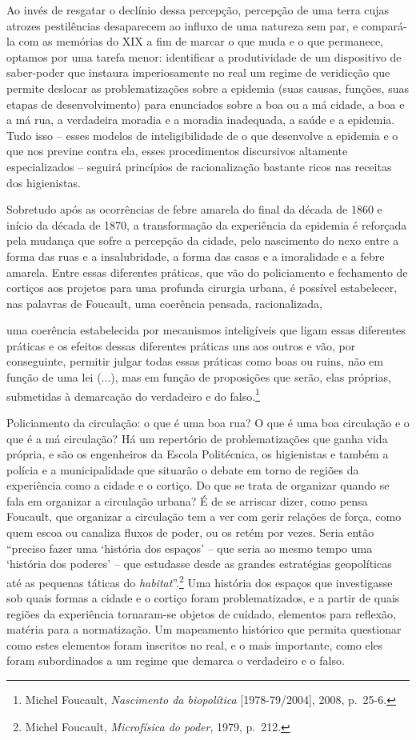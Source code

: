 Ao invés de resgatar o declínio dessa percepção, percepção de uma terra
cujas atrozes pestilências desaparecem ao influxo de uma natureza sem
par, e compará-la com as memórias do XIX a fim de marcar o que muda e o
que permanece, optamos por uma tarefa menor: identificar a produtividade
de um dispositivo de saber-poder que instaura imperiosamente no real um
regime de veridicção que permite deslocar as problematizações sobre a
epidemia (suas causas, funções, suas etapas de desenvolvimento) para
enunciados sobre a boa ou a má cidade, a boa e a má rua, a verdadeira
moradia e a moradia inadequada, a saúde e a epidemia. Tudo isso -- esses
modelos de inteligibilidade de o que desenvolve a epidemia e o que nos
previne contra ela, esses procedimentos discursivos altamente
especializados -- seguirá princípios de racionalização bastante ricos
nas receitas dos higienistas.

Sobretudo após as ocorrências de febre amarela do final da década de
1860 e início da década de 1870, a transformação da experiência da
epidemia é reforçada pela mudança que sofre a percepção da cidade, pelo
nascimento do nexo entre a forma das ruas e a insalubridade, a forma das
casas e a imoralidade e a febre amarela. Entre essas diferentes
práticas, que vão do policiamento e fechamento de cortiços aos projetos
para uma profunda cirurgia urbana, é possível estabelecer, nas palavras
de Foucault, uma coerência pensada, racionalizada,

uma coerência estabelecida por mecanismos inteligíveis que ligam essas
diferentes práticas e os efeitos dessas diferentes práticas uns aos
outros e vão, por conseguinte, permitir julgar todas essas práticas como
boas ou ruins, não em função de uma lei (...), mas em função de
proposições que serão, elas próprias, submetidas à demarcação do
verdadeiro e do falso.\footnote{Michel Foucault, \emph{Nascimento da
  biopolítica} {[}1978-79/2004{]}, 2008, p.~25-6.}

Policiamento da circulação: o que é uma boa rua? O que é uma boa
circulação e o que é a má circulação? Há um repertório de
problematizações que ganha vida própria, e são os engenheiros da Escola
Politécnica, os higienistas e também a polícia e a municipalidade que
situarão o debate em torno de regiões da experiência como a cidade e o
cortiço. Do que se trata de organizar quando se fala em organizar a
circulação urbana? É de se arriscar dizer, como pensa Foucault, que
organizar a circulação tem a ver com gerir relações de força, como quem
escoa ou canaliza fluxos de poder, ou os retém por vezes. Seria então
``preciso fazer uma `história dos espaços' -- que seria ao mesmo tempo
uma `história dos poderes' -- que estudasse desde as grandes estratégias
geopolíticas até as pequenas táticas do \emph{habitat}''.\footnote{Michel
  Foucault, \emph{Microfísica do poder}, 1979, p.~212.} Uma história dos
espaços que investigasse sob quais formas a cidade e o cortiço foram
problematizados, e a partir de quais regiões da experiência tornaram-se
objetos de cuidado, elementos para reflexão, matéria para a
normatização. Um mapeamento histórico que permita questionar como estes
elementos foram inscritos no real, e o mais importante, como eles foram
subordinados a um regime que demarca o verdadeiro e o falso.

